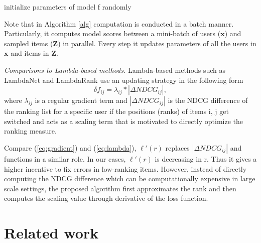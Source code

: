 \documentclass[letterpaper]{article} %
\begin{document}
\begin{algorithm}[!ht]
\SetAlgoLined
{}
 initialize parameters of model f randomly\;
 \caption{}
 \label{alg}
\end{algorithm}

Note that in Algorithm \ref{alg} computation is conducted in a batch manner. Particularly, it computes model scores between a mini-batch of users ($\textbf{x}$) and sampled items ($\textbf{Z}$) in parallel. Every step it updates parameters of all the users in $\textbf{x}$ and items in $\textbf{Z}$.

\textit{Comparisons to Lambda-based methods.} Lambda-based methods such as LambdaNet and LambdaRank use an updating strategy in the following form
\begin{equation}
\label{eq:lambda}
\delta f_{ij} = \lambda_{ij} * |\Delta NDCG_{ij}|,
\end{equation}
where $\lambda_{ij}$ is a regular gradient term and $|\Delta NDCG_{ij}|$ is the NDCG difference of the ranking list for a specific user if the positions (ranks) of items i, j get switched and acts as a  scaling term that is motivated to directly optimize the ranking measure.

Compare (\ref{eq:gradient}) and (\ref{eq:lambda}), $\ell'(r)$ replaces $|\Delta NDCG_{ij}|$ and functions in a similar role. In our cases, $\ell'(r)$ is decreasing in r. Thus it gives a higher incentive to fix errors in low-ranking items. However, instead of directly computing the NDCG difference which can be computationally expensive in large scale settings, the proposed algorithm first approximates the rank and then computes the scaling value through derivative of the loss function.

\section{Related work}
\label{sec:related}
\end{document}
